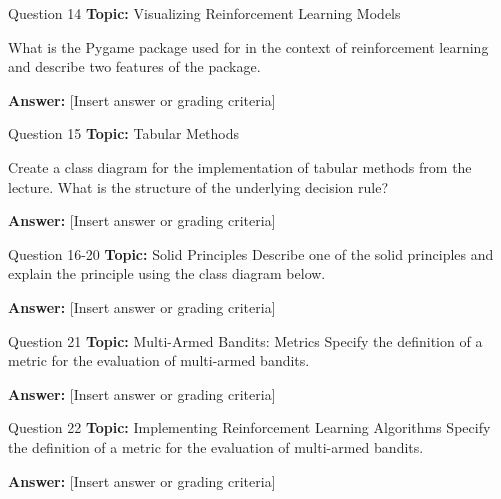 \begin{frame}{Question 14}
    \textbf{Topic:} Visualizing Reinforcement Learning Models
    \vspace{10pt}

    What is the Pygame package used for in the context of reinforcement learning and describe two features of the package. 
    \vspace{20pt}

    \textbf{Answer:} [Insert answer or grading criteria]
\end{frame}

\begin{frame}{Question 15}
    \textbf{Topic:} Tabular Methods
    \vspace{10pt}

    Create a class diagram for the implementation of tabular methods from the lecture. What is the structure of the underlying decision rule? 
    \vspace{20pt}

    \textbf{Answer:} [Insert answer or grading criteria]
\end{frame}

\begin{frame}{Question 16-20}
    \textbf{Topic:} Solid Principles
    \vspace{10pt}
    Describe one of the solid principles and explain the principle using the class diagram below. 
    \vspace{20pt}

    \textbf{Answer:} [Insert answer or grading criteria]
\end{frame}

\begin{frame}{Question 21}
    \textbf{Topic:} Multi-Armed Bandits: Metrics
    \vspace{10pt}
    Specify the definition of a metric for the evaluation of multi-armed bandits.
    \vspace{20pt}

    \textbf{Answer:} [Insert answer or grading criteria]
\end{frame}

\begin{frame}{Question 22}
    \textbf{Topic:} Implementing Reinforcement Learning Algorithms
    \vspace{10pt}
    Specify the definition of a metric for the evaluation of multi-armed bandits.
    \vspace{20pt}

    \textbf{Answer:} [Insert answer or grading criteria]
\end{frame}

